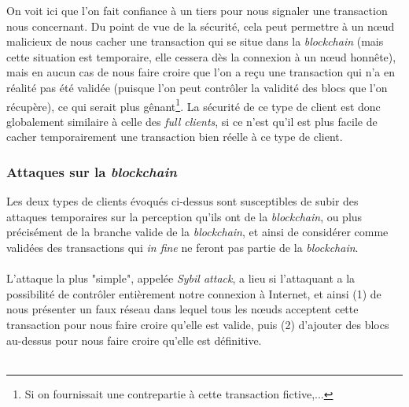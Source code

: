 \documentclass[11pt,a4paper]{article}
\begin{document}
On voit ici que l'on fait confiance à un tiers pour nous signaler une transaction nous concernant. Du point de vue de la sécurité, cela peut permettre à un n\oe{}ud malicieux de nous cacher une transaction qui se situe dans la \textit{blockchain} (mais cette situation est temporaire, elle cessera dès la connexion à un n\oe{}ud honnête), mais en aucun cas de nous faire croire que l'on a reçu une transaction qui n'a en réalité pas été validée (puisque l'on peut contrôler la validité des blocs que l'on récupère), ce qui serait plus gênant\footnote{Si on fournissait une contrepartie à cette transaction fictive,...}. La sécurité de ce type de client est donc globalement similaire à celle des \textit{full clients}, si ce n'est qu'il est plus facile de cacher temporairement une transaction bien réelle à ce type de client.
\subsubsection{Attaques sur la \textit{blockchain}}
Les deux types de clients évoqués ci-dessus sont susceptibles de subir des attaques temporaires sur la perception qu'ils ont de la \textit{blockchain}, ou plus précisément de la branche valide de la \textit{blockchain}, et ainsi de considérer comme validées des transactions qui \textit{in fine} ne feront pas partie de la \textit{blockchain}.\\\\
L'attaque la plus "simple", appelée \textit{Sybil attack}, a lieu si l'attaquant a la possibilité de contrôler entièrement notre connexion à Internet, et ainsi (1) de nous présenter un faux réseau dans lequel tous les n\oe{}uds acceptent cette transaction pour nous faire croire qu'elle est valide, puis (2) d'ajouter des blocs au-dessus pour nous faire croire qu'elle est définitive. \\\\
\end{document}
